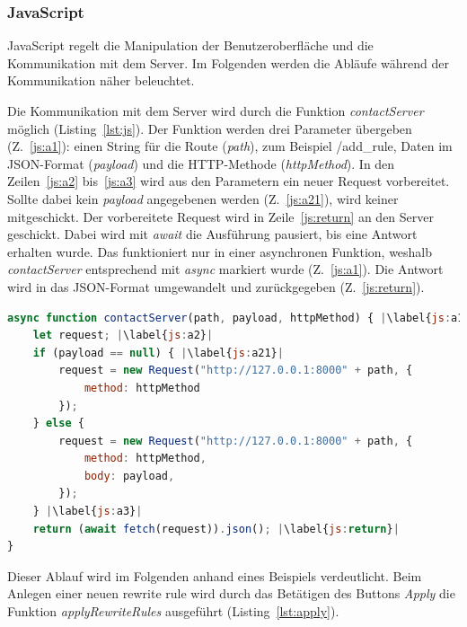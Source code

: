 \subsubsection{JavaScript}

JavaScript regelt die Manipulation der Benutzeroberfläche und die Kommunikation mit dem Server. Im Folgenden werden die Abläufe während der Kommunikation näher beleuchtet.

Die Kommunikation mit dem Server wird durch die Funktion \textit{contactServer} möglich (Listing~\ref{lst:js}).
Der Funktion werden drei Parameter übergeben (Z.~\ref{js:a1}): einen String für die Route (\textit{path}), zum Beispiel /add\_rule, Daten im JSON-Format (\textit{payload})
und die HTTP-Methode (\textit{httpMethod}). In den Zeilen~\ref{js:a2} bis~\ref{js:a3} wird aus den Parametern ein neuer Request vorbereitet. Sollte dabei kein \textit{payload}
angegebenen werden (Z.~\ref{js:a21}), wird keiner mitgeschickt. Der vorbereitete Request wird in Zeile~\ref{js:return} an den Server geschickt. Dabei wird mit \textit{await}
die Ausführung pausiert, bis eine Antwort erhalten wurde. Das funktioniert nur in einer asynchronen Funktion, weshalb \textit{contactServer} entsprechend mit \textit{async} 
markiert wurde (Z.~\ref{js:a1}). Die Antwort wird in das JSON-Format umgewandelt und zurückgegeben (Z.~\ref{js:return}).

\begin{lstlisting}[language=JavaScript, escapechar=|, caption=Auszug aus der Datei \textit{index.js}, label={lst:js}]
async function contactServer(path, payload, httpMethod) { |\label{js:a1}|
    let request; |\label{js:a2}|
    if (payload == null) { |\label{js:a21}|
        request = new Request("http://127.0.0.1:8000" + path, {
            method: httpMethod
        });
    } else {
        request = new Request("http://127.0.0.1:8000" + path, {
            method: httpMethod,
            body: payload,
        });
    } |\label{js:a3}|
    return (await fetch(request)).json(); |\label{js:return}|
}
\end{lstlisting} 

Dieser Ablauf wird im Folgenden anhand eines Beispiels verdeutlicht.
Beim Anlegen einer neuen rewrite rule wird durch das Betätigen des Buttons \textit{Apply} die Funktion \textit{applyRewriteRules} ausgeführt (Listing~\ref{lst:apply}).

